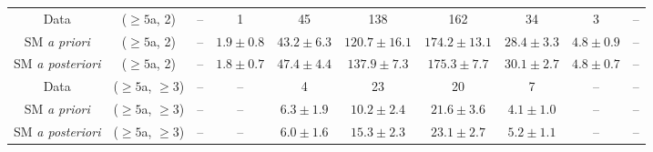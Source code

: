 \begin{table}[h!]
{\begin{tabular}{cccccccccc}
	Data & ($\ge5$a, 2) & -- & 1 & 45 & 138 & 162 & 34 & 3 & -- \\[0.5ex] 
	SM \textit{a priori} & ($\ge5$a, 2) & -- & $1.9\pm 0.8$ & $43.2\pm 6.3$ & $120.7\pm 16.1$ & $174.2\pm 13.1$ & $28.4\pm 3.3$ & $4.8\pm 0.9$ & -- \\[0.5ex] 
	SM \textit{a posteriori} & ($\ge5$a, 2) & -- & $1.8\pm 0.7$ & $47.4\pm 4.4$ & $137.9\pm 7.3$ & $175.3\pm 7.7$ & $30.1\pm 2.7$ & $4.8\pm 0.7$ & -- \\[0.5ex] 
	Data & ($\ge5$a, $\ge3$) & -- & -- & 4 & 23 & 20 & 7 & -- & -- \\[0.5ex] 
	SM \textit{a priori} & ($\ge5$a, $\ge3$) & -- & -- & $6.3\pm 1.9$ & $10.2\pm 2.4$ & $21.6\pm 3.6$ & $4.1\pm 1.0$ & -- & -- \\[0.5ex] 
	SM \textit{a posteriori} & ($\ge5$a, $\ge3$) & -- & -- & $6.0\pm 1.6$ & $15.3\pm 2.3$ & $23.1\pm 2.7$ & $5.2\pm 1.1$ & -- & -- \\[0.5ex] 
	\hline
	\hline
\end{tabular}}
\end{table}
